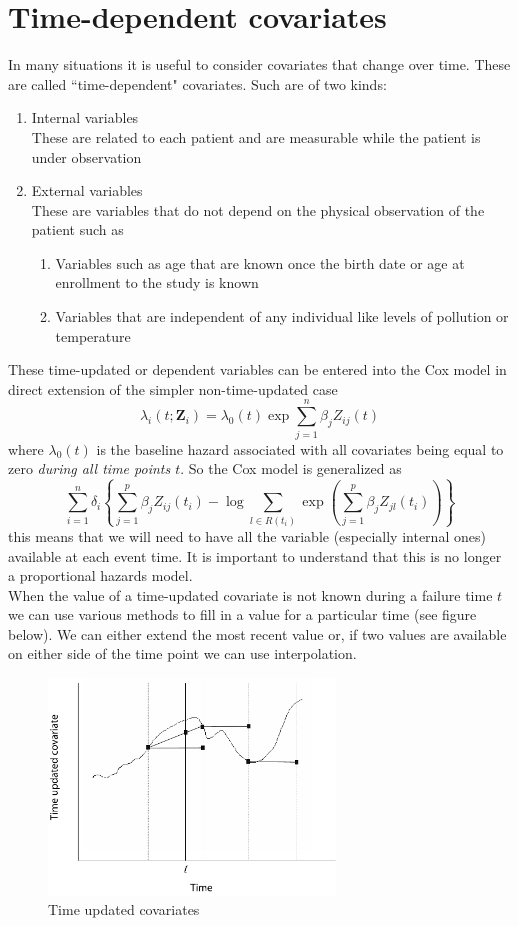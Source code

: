 \documentclass[10pt]{book}
\newcommand{\bfZ}{\mathbf{Z}}
\begin{document}
\setcounter{chapter}{8}\setcounter{page}{141}
\chapter{Time-dependent covariates}
In many situations it is useful to consider covariates that change over time.  These are called
``time-dependent" covariates.  Such are of two kinds:
\begin{enumerate}
\item Internal variables\\
These are related to each patient and are measurable while the patient is under observation
\item External variables\\
These are variables that do not depend on the physical observation of the patient such as
\begin{enumerate}
\item Variables such as age that are known once the birth date or age at enrollment to the study is known
\item Variables that are independent of any individual like levels of pollution or temperature
\end{enumerate}
\end{enumerate}
These time-updated or dependent variables can be entered into the Cox model in direct extension of the
simpler non-time-updated case
$$
\lambda_i(t;\bfZ_i)=\lambda_0(t)\exp{\sum_{j=1}^n\beta_jZ_{ij}(t)}
$$
where $\lambda_0(t)$ is the baseline hazard associated with all covariates being equal to zero {\it during all
time points $t$}.  So the Cox model is generalized as
$$
\sum_{i=1}^n\delta_i\left \{ \sum_{j=1}^p\beta_jZ_{ij}(t_i)-\log\sum_{l\in R(t_i)}\exp\left (
\sum_{j=1}^p\beta_jZ_{jl}(t_i)\right )\right \}
$$
this means that we will need to have all the variable (especially internal ones) available at each event time.  It is important to understand that this is no longer a proportional hazards model.
\\[2ex]
When the value of a time-updated covariate is not known during a failure time $t$ we can use various methods to fill in a value for a particular time (see figure below).  We can either extend the most recent value or, if two values  are available on either side of the time point we can use interpolation.
\begin{figure}[ht]
\centerline{\includegraphics[width=3in]{lect8_g1.pdf}}
\caption{Time updated covariates}
\end{figure}
\end{document}
